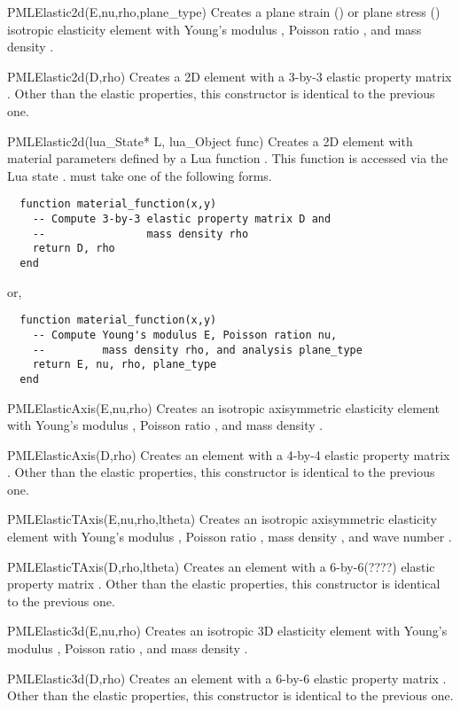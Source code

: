 \begin{codelist}

  \item[PMLElastic2d(E,nu,rho,plane\_type)]
    Creates a plane strain () or plane stress
    () isotropic elasticity element with
    Young's modulus , Poisson ratio , and mass
    density .  

  \item[PMLElastic2d(D,rho)]
    Creates a 2D element with a 3-by-3 elastic property matrix
    .  Other than the elastic properties, this constructor
    is identical to the previous one.

  \item[PMLElastic2d(lua\_State* L, lua\_Object func)]
    Creates a 2D element with material parameters defined by a
    Lua function . This function is accessed via the 
    Lua state .  must take one of the following
    forms. 
    \begin{verbatim}
  function material_function(x,y)
    -- Compute 3-by-3 elastic property matrix D and 
    --                mass density rho
    return D, rho
  end
    \end{verbatim}
    or,
    \begin{verbatim}
  function material_function(x,y)
    -- Compute Young's modulus E, Poisson ration nu, 
    --         mass density rho, and analysis plane_type
    return E, nu, rho, plane_type
  end
    \end{verbatim}
  
  \item[PMLElasticAxis(E,nu,rho)]
    Creates an isotropic axisymmetric elasticity element with
    Young's modulus , Poisson ratio , and mass
    density .  

  \item[PMLElasticAxis(D,rho)]
    Creates an element with a 4-by-4 elastic property matrix
    .  Other than the elastic properties, this constructor
    is identical to the previous one.

  \item[PMLElasticTAxis(E,nu,rho,ltheta)]
    Creates an isotropic axisymmetric elasticity element with
    Young's modulus , Poisson ratio , mass
    density , and wave number .

  \item[PMLElasticTAxis(D,rho,ltheta)]
    Creates an element with a 6-by-6(????) elastic property matrix
    .  Other than the elastic properties, this constructor
    is identical to the previous one.

  \item[PMLElastic3d(E,nu,rho)] 
    Creates an isotropic 3D elasticity element with Young's modulus
    , Poisson ratio , and mass density
    .  

  \item[PMLElastic3d(D,rho)]
    Creates an element with a 6-by-6 elastic property matrix
    .  Other than the elastic properties, this constructor
    is identical to the previous one.

\end{codelist}

